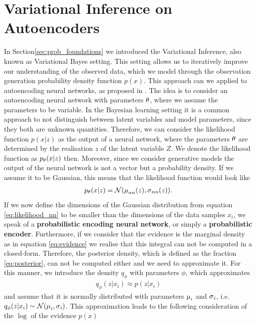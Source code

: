 \section{Variational Inference on Autoencoders}\label{sec:vi_on_ae}

In Section\ref{sec:prob_foundations} we introduced the Variational Inference, also known as Variational Bayes setting. This setting allows us to iteratively improve our understanding of the observed data, which we model through the observation generation probability density function $p(x)$. This approach can we applied to autoencoding neural networks, as proposed in \cite{kingma2013auto}. The idea is to consider an autoencoding neural network with parameters $\theta$, where we assume the parameters to be variable. In the Bayesian learning setting it is a common approach to not distinguish between latent variables and model parameters, since they both are unknown quantities. Therefore, we can consider the likelihood function $p(x|z)$ as the output of a neural network, where the parameters $\theta$ are determined by the realisation $z$ of the latent variable $Z$. We denote the likelihood function as $p_\theta(x|z)$ then. Moreover, since we consider generative models the output of the neural network is not a vector but a probability density. If we assume it to be Gaussian, this means that the likelihood function would look like
\begin{align}\label{eq:likelihood_nn}
p_\theta(x|z) = \mathcal{N} (\operatorname{\mu}_{nn}(z), \operatorname{\sigma}_{nn}(z)).
\end{align}
If we now define the dimensions of the Gaussian distribution from equation \eqref{eq:likelihood_nn} to be smaller than the dimensions of the data samples $x_i$, we speak of a \textbf{probabilistic encoding neural network}, or simply a \textbf{probabilistic encoder}.  Furthermore, if we consider that the evidence is the marginal density as in equation \eqref{eq:evidence} we realise that this integral can not be computed in a closed-form. Therefore, the posterior density, which is defined as the fraction \eqref{eq:posterior}, can not be computed either and we need to approximate it. For this manner, we introduce the density $q_{\phi}$ with parameters $\phi$, which approximates
\begin{align*}
q_{\phi}(z|x_i) \approx p(z|x_i)
\end{align*}
and assume that it is normally distributed with parameters $\operatorname{\mu}_i$ and $\operatorname{\sigma}_i$, i.e. $q_{\phi}(z|x_i) \sim \mathcal{N} (\operatorname{\mu}_i, \operatorname{\sigma}_i)$. This approximation leads to the following consideration of the $\log$ of the evidence $p(x)$
